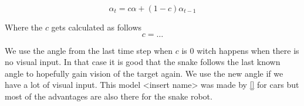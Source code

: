 \begin{equation}
\alpha_t = c \alpha + \left(1 - c\right) \alpha_{t-1}
\end{equation}

Where the $c$ gets calculated as follows
\begin{equation}
c = \dots
\end{equation}

We use the angle from the last time step when $c$ is $0$ witch happens when there is no visual input. In that case it is good that the snake follows the last known angle to hopefully gain vision of the target again. We use the new angle if we have a lot of visual input. This model <insert name> was made by \ref{} for cars but most of the advantages are also there for the snake robot.